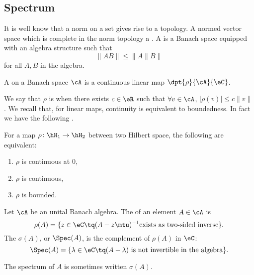 \subsection{Spectrum}

It is well know that a norm on a set gives rise to a topology. A normed vector space which is complete in the norm topology a . A  is a Banach space equipped with an algebra structure such that 
\begin{equation} \label{eq:normBanach}
  \|AB\|\leq\|A\|B\|
\end{equation}
for all $A,B$ in the algebra. \label{def_banach}

\begin{definition}			\label{def:fonctionelle}
A  on a Banach space $\cA$ is a continuous linear map $\dpt{\rho}{\cA}{\eC}$. 
\end{definition}
We say that $\rho$ is  when there exists $c\in\eR$ such that $\forall v\in\cA$,  $|\rho(v)|\leq c\|v\|$.  We recall that, for linear maps, continuity is equivalent to boundedness. In fact we have the following \cite{Ops_Hilb_space}.
\begin{proposition}
	For a map $\rho\colon \hH_1\to \hH_2$ between two Hilbert space, the following are equivalent:
	\begin{enumerate}
	\item $\rho$ is continuous at $0$,
	\item $\rho$ is continuous,
	\item $\rho$ is bounded.
	\end{enumerate}
\end{proposition}

\begin{definition} 
	Let $\cA$ be an unital Banach algebra. The  of an element $A\in \cA$ is
	\begin{equation}
	  \rho(A)=\{ z\in\eC\tq(A-z\mtu)^{-1}\text{exists as two-sided inverse}  \}.
	\end{equation}
	The  $\sigma(A)$, or $\Spec(A)$, is the complement of $\rho(A)$ in $\eC$:
	\begin{equation}
	\Spec(A)=\{ \lambda\in\eC\tq\text{$(A-\lambda)$ is not invertible in the algebra} \}.
	\end{equation}
\end{definition}
The spectrum of $A$ is sometimes written $\sigma(A)$. 


